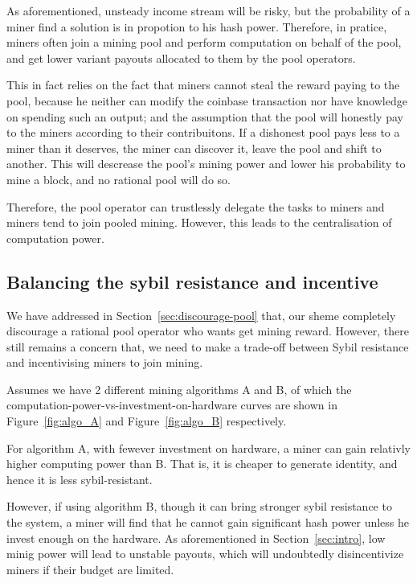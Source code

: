 As aforementioned, unsteady income stream will be risky, but the probability of a miner find a solution is in propotion to his hash power.
Therefore, in pratice, miners often join a mining pool and perform computation on behalf of the pool, and get lower variant payouts allocated to them by the pool operators.

This in fact relies on the fact that miners cannot steal the reward paying to the pool, because he neither can modify the coinbase transaction nor have knowledge on spending such an output;
and the assumption that the pool will honestly pay to the miners according to their contribuitons.
If a dishonest pool pays less to a miner than it deserves, the miner can discover it, leave the pool and shift to another.
This will descrease the pool's mining power and lower his probability to mine a block, and no rational pool will do so.

Therefore, the pool operator can trustlessly delegate the tasks to miners and miners tend to join pooled mining.
However, this leads to the centralisation of computation power.

\subsection{Balancing the sybil resistance and incentive}
\label{sebsec:balancing}

We have addressed in Section~\ref{sec:discourage-pool} that, our sheme completely discourage a rational pool operator who wants get mining reward.
However, there still remains a concern that, we need to make a trade-off between Sybil resistance and incentivising miners to join mining.


Assumes we have 2 different mining algorithms A and B, of which the computation-power-vs-investment-on-hardware curves are shown in Figure~\ref{fig:algo_A} and Figure~\ref{fig:algo_B} respectively.

For algorithm A, with fewever investment on hardware, a miner can gain relativly higher computing power than B. That is, it is cheaper to generate identity, and hence it is less sybil-resistant.

However, if using algorithm B, though it can bring stronger sybil resistance to the system, a miner will find that he cannot gain significant hash power unless he invest enough on the hardware.
As aforementioned in Section~\ref{sec:intro}, low minig power will lead to unstable payouts, which will undoubtedly disincentivize miners if their budget are limited.

